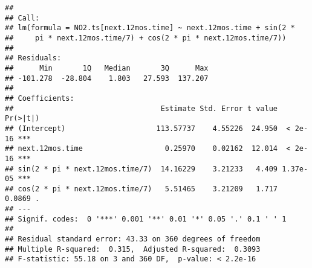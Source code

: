 \documentclass[
]{article}
\newenvironment{Shaded}{\begin{snugshade}}{\end{snugshade}}
\newcommand{\CommentTok}[1]{\textcolor[rgb]{0.56,0.35,0.01}{\textit{#1}}}
\newcommand{\DataTypeTok}[1]{\textcolor[rgb]{0.13,0.29,0.53}{#1}}
\newcommand{\DecValTok}[1]{\textcolor[rgb]{0.00,0.00,0.81}{#1}}
\newcommand{\FloatTok}[1]{\textcolor[rgb]{0.00,0.00,0.81}{#1}}
\newcommand{\KeywordTok}[1]{\textcolor[rgb]{0.13,0.29,0.53}{\textbf{#1}}}
\newcommand{\NormalTok}[1]{#1}
\newcommand{\OperatorTok}[1]{\textcolor[rgb]{0.81,0.36,0.00}{\textbf{#1}}}
\newcommand{\StringTok}[1]{\textcolor[rgb]{0.31,0.60,0.02}{#1}}
\begin{document}
\begin{Shaded}
\end{Shaded}

\begin{verbatim}
## 
## Call:
## lm(formula = NO2.ts[next.12mos.time] ~ next.12mos.time + sin(2 * 
##     pi * next.12mos.time/7) + cos(2 * pi * next.12mos.time/7))
## 
## Residuals:
##      Min       1Q   Median       3Q      Max 
## -101.278  -28.804    1.803   27.593  137.207 
## 
## Coefficients:
##                                  Estimate Std. Error t value Pr(>|t|)    
## (Intercept)                     113.57737    4.55226  24.950  < 2e-16 ***
## next.12mos.time                   0.25970    0.02162  12.014  < 2e-16 ***
## sin(2 * pi * next.12mos.time/7)  14.16229    3.21233   4.409 1.37e-05 ***
## cos(2 * pi * next.12mos.time/7)   5.51465    3.21209   1.717   0.0869 .  
## ---
## Signif. codes:  0 '***' 0.001 '**' 0.01 '*' 0.05 '.' 0.1 ' ' 1
## 
## Residual standard error: 43.33 on 360 degrees of freedom
## Multiple R-squared:  0.315,  Adjusted R-squared:  0.3093 
## F-statistic: 55.18 on 3 and 360 DF,  p-value: < 2.2e-16
\end{verbatim}
\end{document}
